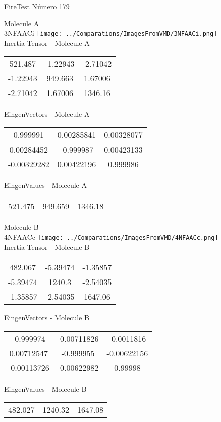 \vtab[-2cm]
\begin{center}
{\large FireTest \tab Número 179}
\end{center}
\begin{multicols}{2}
\begin{center}

Molecule A \\ 
3NFAACi
\texttt{[image: ../Comparations/ImagesFromVMD/3NFAACi.png]}
\\
Inertia Tensor - Molecule A \\
\vtab

\begin{tabular}{|c c c|}
521.487	 & 	-1.22943	 & 	-2.71042	 \\
-1.22943	 & 	949.663	 & 	1.67006	 \\
-2.71042	 & 	1.67006	 & 	1346.16
\end{tabular}

\vtab
 EingenVectors - Molecule A     \\
\vtab
\begin{tabular}{|c c c|}
0.999991	 & 	0.00285841	 & 	0.00328077	 \\
0.00284452	 & 	-0.999987	 & 	0.00423133	 \\
-0.00329282	 & 	0.00422196	 & 	0.999986
\end{tabular}

\vtab
 EingenValues - Molecule A     \\
\vtab
\begin{tabular}{|c c c|}
521.475	 & 	949.659	 & 	1346.18	 \\
\end{tabular}
\columnbreak

Molecule B \\ 
4NFAACc
\texttt{[image: ../Comparations/ImagesFromVMD/4NFAACc.png]}
\\
Inertia Tensor - Molecule B \\
\vtab

\begin{tabular}{|c c c|}
482.067	 & 	-5.39474	 & 	-1.35857	 \\
-5.39474	 & 	1240.3	 & 	-2.54035	 \\
-1.35857	 & 	-2.54035	 & 	1647.06
\end{tabular}

\vtab
 EingenVectors - Molecule B     \\
\vtab
\begin{tabular}{|c c c|}
-0.999974	 & 	-0.00711826	 & 	-0.0011816	 \\
0.00712547	 & 	-0.999955	 & 	-0.00622156	 \\
-0.00113726	 & 	-0.00622982	 & 	0.99998
\end{tabular}

\vtab
 EingenValues - Molecule B     \\
\vtab
\begin{tabular}{|c c c|}
482.027	 & 	1240.32	 & 	1647.08	 \\
\end{tabular}

\end{center}
\end{multicols}
